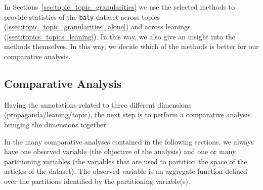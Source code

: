 
In Sections~\ref{sec:topic_topic_granularities} we use the selected methods to provide statistics of the \texttt{baly} dataset across topics (\ref{ssec:topic_topic_granularities_alone}) and across leanings (\ref{ssec:topics_topics_leaning}). In this way, we also give an insight into the methods themselves. In this way, we decide which of the methods is better for our comparative analysis.

\subsection{\statusgreen Comparative Analysis}
\label{sec:topic_method_comparative}

Having the annotations related to three different dimensions (propaganda/leaning/topic), the next step is to perform a comparative analysis bringing the dimensions together.

In the many comparative analyses contained in the following sections, we always have one observed variable (the objective of the analysis) and one or many partitioning variables (the variables that are used to partition the space of the articles of the dataset). The observed variable is an aggregate function defined over the partitions identified by the partitioning variable(s).

\begin{table}[!htbp]
    \centering
    \caption{The comparative analyses of this chapter}
    \label{tab:comparative_analyses}
\end{table}

